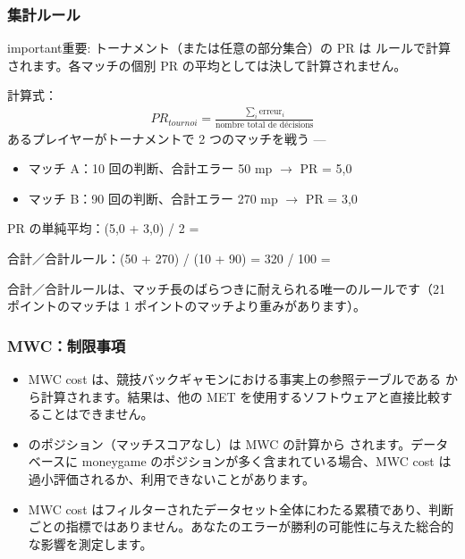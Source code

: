 \documentclass[letterpaper,10pt,dvipdfmx]{sphinxmanual}
\begin{document}
\subsubsection{集計ルール}
\label{\detokenize{manuel:regle-d-agregation}}
\begin{sphinxadmonition}{important}{重要:}
\sphinxAtStartPar
トーナメント（または任意の部分集合）の PR は  ルールで計算されます。各マッチの個別 PR の平均としては決して計算されません。

\sphinxAtStartPar
計算式：
\begin{equation*}
\begin{split}PR_{tournoi} = \frac{\sum_{i} \text{erreur}_i}{\text{nombre total de décisions}}\end{split}
\end{equation*}
\sphinxAtStartPar
{} あるプレイヤーがトーナメントで 2 つのマッチを戦う —
\begin{itemize}
\item {} 
\sphinxAtStartPar
マッチ A：10 回の判断、合計エラー 50 mp \(\rightarrow\) PR = 5,0

\item {} 
\sphinxAtStartPar
マッチ B：90 回の判断、合計エラー 270 mp \(\rightarrow\) PR = 3,0

\end{itemize}

\sphinxAtStartPar
PR の単純平均：(5,0 + 3,0) / 2 =  

\sphinxAtStartPar
合計／合計ルール：(50 + 270) / (10 + 90) = 320 / 100 =  

\sphinxAtStartPar
合計／合計ルールは、マッチ長のばらつきに耐えられる唯一のルールです（21 ポイントのマッチは 1 ポイントのマッチより重みがあります）。
\end{sphinxadmonition}


\subsubsection{MWC：制限事項}
\label{\detokenize{manuel:mwc-limitations}}\begin{itemize}
\item {} 
\sphinxAtStartPar
MWC cost は、競技バックギャモンにおける事実上の参照テーブルである  から計算されます。結果は、他の MET を使用するソフトウェアと直接比較することはできません。

\item {} 
\sphinxAtStartPar
{} のポジション（マッチスコアなし）は MWC の計算から  されます。データベースに money\sphinxhyphen{}game のポジションが多く含まれている場合、MWC cost は過小評価されるか、利用できないことがあります。

\item {} 
\sphinxAtStartPar
MWC cost はフィルターされたデータセット全体にわたる累積であり、判断ごとの指標ではありません。あなたのエラーが勝利の可能性に与えた総合的な影響を測定します。

\end{itemize}
\end{document}
